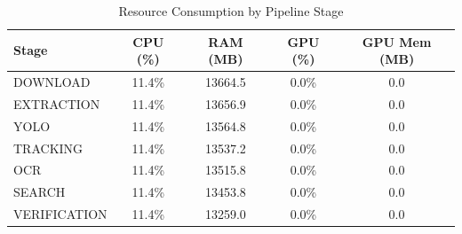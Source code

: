 \begin{table}[h]
\caption{Resource Consumption by Pipeline Stage}
\label{tab:resources}
\centering
\begin{tabular}{|l|c|c|c|c|}
\hline
Stage & CPU (\%) & RAM (MB) & GPU (\%) & GPU Mem (MB) \\
\hline
DOWNLOAD & 11.4\% & 13664.5 & 0.0\% & 0.0 \\
EXTRACTION & 11.4\% & 13656.9 & 0.0\% & 0.0 \\
YOLO & 11.4\% & 13564.8 & 0.0\% & 0.0 \\
TRACKING & 11.4\% & 13537.2 & 0.0\% & 0.0 \\
OCR & 11.4\% & 13515.8 & 0.0\% & 0.0 \\
SEARCH & 11.4\% & 13453.8 & 0.0\% & 0.0 \\
VERIFICATION & 11.4\% & 13259.0 & 0.0\% & 0.0 \\
\hline
\end{tabular}
\end{table}
